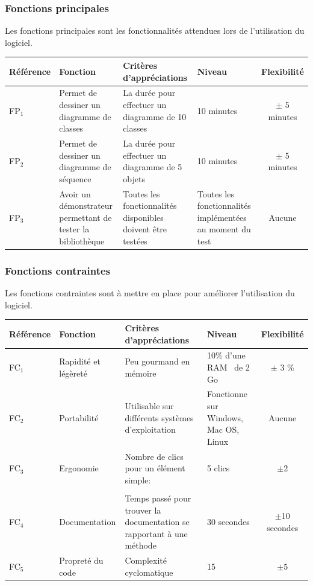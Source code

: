 \documentclass[12pt,a4paper,openany]{article}
\begin{document}
	\subsubsection{Fonctions principales}
	Les fonctions principales sont les fonctionnalités attendues lors de l'utilisation du logiciel.\\
	\begin{tabular}{|p{2cm}|p{3.4cm}|p{5cm}|p{3.8cm}|c|}
		\hline
		\textbf{Référence}& \textbf{Fonction} & \textbf{Critères d'appréciations} & \textbf{Niveau} & \textbf{Flexibilité} \\
		\hline
			FP$_1$ & Permet de dessiner un diagramme de classes & La durée pour effectuer un diagramme de 10 classes & 10 minutes & $\pm$ 5 minutes\\
		\hline
			FP$_2$ & Permet de dessiner un diagramme de séquence & La durée pour effectuer un diagramme de 5 objets & 10 minutes & $\pm$ 5 minutes\\
		\hline
			FP$_3$ & Avoir un démonstrateur permettant de tester la bibliothèque & Toutes les fonctionnalités disponibles doivent être testées & Toutes les fonctionnalités implémentées au moment du test & Aucune \\
		\hline
	\end{tabular}
	\subsubsection{Fonctions contraintes}
	Les fonctions contraintes sont à mettre en place pour améliorer l'utilisation du logiciel.\\
	\begin{tabular}{|p{2cm}|p{3.4cm}|p{5cm}|p{3.8cm}|c|}
		\hline
		\textbf{Référence}& \textbf{Fonction} & \textbf{Critères d'appréciations} & \textbf{Niveau} & \textbf{Flexibilité} \\
		\hline
		FC$_1$ & Rapidité et légèreté & Peu gourmand en mémoire & 10\% d'une RAM \footnotemark~de 2 Go & $\pm$ 3 \%\\
		\hline
			FC$_2$ & Portabilité & Utilisable sur différents systèmes d'exploitation & Fonctionne sur Windows, Mac OS, Linux & Aucune \\
		\hline
		FC$_3$ & Ergonomie & Nombre de clics pour un élément simple: & 5 clics &$\pm$2\\& &\begin{center}\end{center}&  & \\
		\hline
			FC$_4$ & Documentation & Temps passé pour trouver la documentation se rapportant à une méthode &30 secondes& $\pm$10 secondes \\ 
		\hline
			FC$_5$ & Propreté du code & Complexité cyclomatique& 15 & $\pm5$\\ 
		\hline
	\end{tabular}
\end{document}
